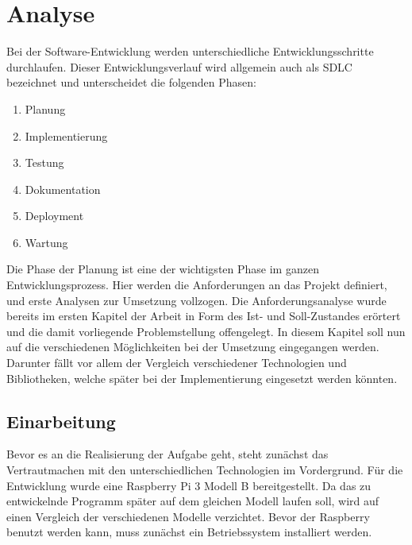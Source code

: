 
\chapter{Analyse}
Bei der Software-Entwicklung werden unterschiedliche Entwicklungsschritte
durchlaufen. Dieser Entwicklungsverlauf wird allgemein auch als \ac{SDLC} bezeichnet
und unterscheidet die folgenden Phasen:
\begin{enumerate}
\item Planung
\item Implementierung
\item Testung
\item Dokumentation
\item Deployment
\item Wartung
\end{enumerate}

Die Phase der Planung ist eine der wichtigsten Phase im ganzen
Entwicklungsprozess. Hier werden die Anforderungen an das Projekt definiert,
und erste Analysen zur Umsetzung vollzogen. \autocite{SDLC_2019} Die
Anforderungsanalyse wurde bereits im ersten Kapitel der Arbeit in Form des Ist-
und Soll-Zustandes erörtert und die damit vorliegende Problemstellung
offengelegt. \newline In diesem Kapitel soll nun auf die verschiedenen
Möglichkeiten bei der Umsetzung eingegangen werden. Darunter fällt vor allem
der Vergleich verschiedener Technologien und Bibliotheken, welche später bei
der Implementierung eingesetzt werden könnten. 


\section{Einarbeitung}
Bevor es an die Realisierung der Aufgabe geht, steht zunächst das
Vertrautmachen mit den unterschiedlichen Technologien im Vordergrund. Für die
Entwicklung wurde eine Raspberry Pi 3 Modell B bereitgestellt. Da das zu
entwickelnde Programm später auf dem gleichen Modell laufen soll, wird auf
einen Vergleich der verschiedenen Modelle verzichtet. Bevor der Raspberry
benutzt werden kann, muss zunächst ein Betriebssystem installiert werden.
\hfill \break

